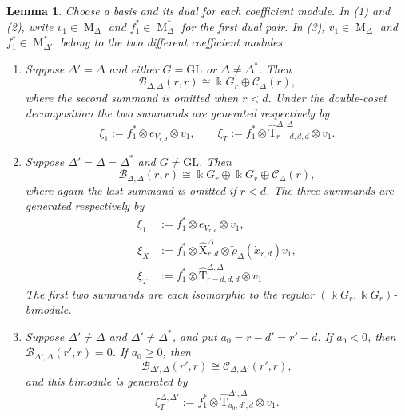 \documentclass[12pt]{amsart}
\numberwithin{itemcounter}{subsection}
\theoremstyle{plain}
\newtheorem{lemma}[theorem]{Lemma}
\theoremstyle{definition}
\theoremstyle{remark}
\numberwithin{equation}{section}
\def\k{\Bbbk}
\def\GL{\mathrm{GL}}
\def\M{{\operatorname{M}\nolimits}}
\begin{document}
\begin{lemma}
\label{lem:finite-bimodule-decomposition}
Choose a basis and its dual for each coefficient module.
In (1) and (2), write \(v_1\in\M_\Delta\) and \(f_1^*\in\M_\Delta^*\)
for the first dual pair.  In (3), \(v_1\in\M_\Delta\) and
\(f_1^*\in\M_{\Delta'}^*\) belong to the two different coefficient modules.
\begin{enumerate}
\item[(1)]
Suppose \(\Delta'=\Delta\) and either \(G=\GL\) or
\(\Delta\ne\Delta^*\). Then
\[
\mathscr B_{\Delta,\Delta}(r,r)
\cong \k G_r\oplus\mathscr C_\Delta(r),
\]
where the second summand is omitted when \(r<d\). Under the double-coset
 decomposition the two summands are generated respectively by
\[
\xi_1:=f_1^*\otimes e_{V_{r,d}}\otimes v_1,
\qquad
\xi_T:=f_1^*\otimes
\widehat{\mathrm{T}}^{\Delta,\Delta}_{r-d,d,d}\otimes v_1.
\]

\item[(2)]
Suppose \(\Delta'=\Delta=\Delta^*\) and \(G\ne\GL\). Then
\[
\mathscr B_{\Delta,\Delta}(r,r)
\cong \k G_r\oplus\k G_r\oplus\mathscr C_\Delta(r),
\]
where again the last summand is omitted if \(r<d\). The three summands are
 generated respectively by
\begin{align*}
\xi_1&:=f_1^*\otimes e_{V_{r,d}}\otimes v_1,\\
\xi_X&:=f_1^*\otimes\widehat{\mathrm{X}}^\Delta_{r,d}\otimes
\widetilde\rho_\Delta(\dot x_{r,d})v_1,\\
\xi_T&:=f_1^*\otimes\widehat{\mathrm{T}}^{\Delta,\Delta}_{r-d,d,d}\otimes v_1.
\end{align*}
The first two summands are each isomorphic to the regular
\((\k G_r,\k G_r)\)-bimodule.

\item[(3)]
Suppose \(\Delta'\ne\Delta\) and \(\Delta'\ne\Delta^*\), and put
\(a_0=r-d'=r'-d\). If \(a_0<0\), then
\(\mathscr B_{\Delta',\Delta}(r',r)=0\). If \(a_0\ge0\), then
\[
\mathscr B_{\Delta',\Delta}(r',r)
\cong\mathscr C_{\Delta,\Delta'}(r',r),
\]
and this bimodule is generated by
\[
\xi_T^{\Delta,\Delta'}
:=f_1^*\otimes\widehat{\mathrm{T}}^{\Delta',\Delta}_{a_0,d',d}\otimes v_1.
\]
\end{enumerate}
\end{lemma}
\end{document}
